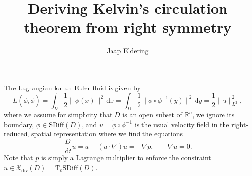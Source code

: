 \documentclass[a4paper,11pt]{article}
\title{Deriving Kelvin's circulation theorem from right symmetry}
\author{Jaap Eldering}
\renewcommand{\d}{\ensuremath{\,\textrm{d}}}
\begin{document}
\maketitle

The Lagrangian for an Euler fluid is given by
\begin{equation}\label{eq:Euler-lagrangian}
  L(\phi,\dot{\phi})
  = \int_D \frac{1}{2} \| \dot{\phi}(x) \|^2 \d x
  = \int_D \frac{1}{2} \| \dot{\phi}\circ\phi^{-1}(y) \|^2 \d y
  = \frac{1}{2} \| u \|_{L^2}^2,
\end{equation}
where we assume for simplicity that $D$ is an open subset of
$\mathbb{R}^n$, we ignore its boundary, $\phi \in \textrm{SDiff}(D)$,
and $u = \dot{\phi}\circ\phi^{-1}$ is the usual velocity field in the
right-reduced, spatial representation where we find the equations
\begin{equation*}
  \frac{D}{\d t} u = \dot{u} + (u \cdot \nabla)u = - \nabla p, \qquad \nabla u = 0.
\end{equation*}
Note that $p$ is simply a Lagrange multiplier to enforce the
constraint $u \in \mathfrak{X}_\text{div}(D) = \textrm{T}_e \textrm{SDiff}(D)$.
\end{document}
